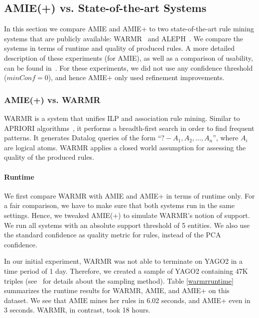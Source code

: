 




\subsection{AMIE(+) vs. State-of-the-art Systems} \label{competitors}
In this section we compare AMIE and AMIE+ to two state-of-the-art rule mining systems
that are publicly available:
WARMR~\cite{GoeVan02} and ALEPH~\cite{Muggleton:1996:LPD:647996.742465}. We compare the systems in terms of runtime and quality of produced rules. A more detailed description of these experiments (for AMIE), as well as a comparison of usability, can be found in~\cite{amie}.
For these experiments, we did not use any confidence threshold ($minConf=0$), and hence AMIE+ only used refinement improvements.

\subsubsection{AMIE(+) vs. WARMR}
WARMR is a system that unifies ILP and association rule mining. Similar to APRIORI algorithms~\cite{Agrawal:1996:FDA:257938.257975}, it performs a
breadth-first search in order to find frequent patterns.
It generates Datalog queries of the form ``$?-A_1,A_2,...,A_n$'',
where $A_i$ are logical atoms. WARMR applies a closed world assumption for assessing the quality of the produced rules.

\paragraph{Runtime}
We first compare WARMR with AMIE and AMIE+ in terms of runtime only.
For a fair comparison, we have to make sure that both systems run in the same settings. Hence, we tweaked AMIE(+) to simulate WARMR's notion of support.
We run all systems with an absolute support threshold of 5 entities.
We also use the standard confidence as quality metric for rules, instead of the PCA confidence.

In our initial experiment, WARMR was not able to terminate on YAGO2 in a time period of 1 day.
Therefore, we created a sample of YAGO2 containing 47K triples (see~\cite{amie} for details about the sampling method).
Table \ref{warmrruntime} summarizes the runtime results for WARMR, AMIE, and AMIE+ on this dataset.
We see that AMIE mines her rules in 6.02 seconds, and AMIE+ even in 3 seconds. WARMR, in contrast, took 18 hours.

